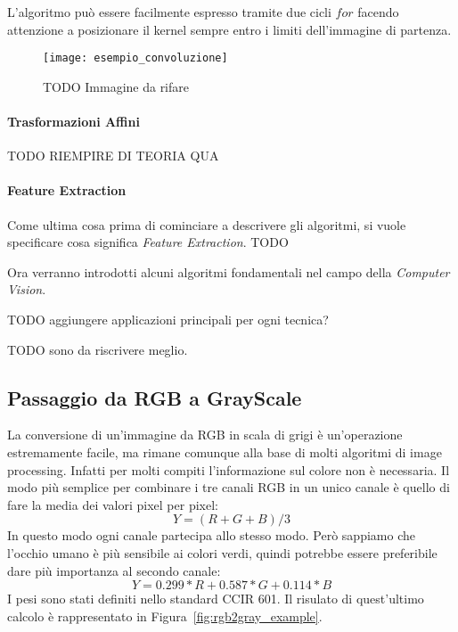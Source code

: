 L'algoritmo può essere facilmente espresso tramite due cicli $for$ facendo attenzione a posizionare il kernel sempre entro i limiti dell'immagine di partenza.


\begin{figure}[ht]
  \texttt{[image: esempio\_convoluzione]}
  \caption{TODO Immagine da rifare}
  \label{fig:conv_example}
\end{figure}

\paragraph{Trasformazioni Affini}

TODO RIEMPIRE DI TEORIA QUA

\paragraph{Feature Extraction}
Come ultima cosa prima di cominciare a descrivere gli algoritmi, si vuole specificare cosa significa \textit{Feature Extraction}.
TODO


\clearpage
Ora verranno introdotti alcuni algoritmi fondamentali nel campo della \textit{Computer Vision}.

TODO aggiungere applicazioni principali per ogni tecnica?

TODO sono da riscrivere meglio.


\subsection {Passaggio da RGB a GrayScale}
La conversione di un'immagine da RGB in scala di grigi è un'operazione estremamente facile, ma rimane comunque alla base di molti algoritmi di image processing.
Infatti per molti compiti l'informazione sul colore non è necessaria.
Il modo più semplice per combinare i tre canali RGB in un unico canale è quello di fare la media dei valori pixel per pixel:
\begin{equation}
  Y = (R + G + B)/3
\end{equation}
\label{eq:rgb2gray_avg}
In questo modo ogni canale partecipa allo stesso modo.
Però sappiamo che l'occhio umano è più sensibile ai colori verdi, quindi potrebbe essere preferibile dare più importanza al secondo canale:
\begin{equation}
  Y = 0.299*R + 0.587*G + 0.114*B
\end{equation}
\label{eq:rgb2gray}
I pesi sono stati definiti nello standard CCIR 601.
Il risulato di quest'ultimo calcolo è rappresentato in Figura~\ref{fig:rgb2gray_example}.

